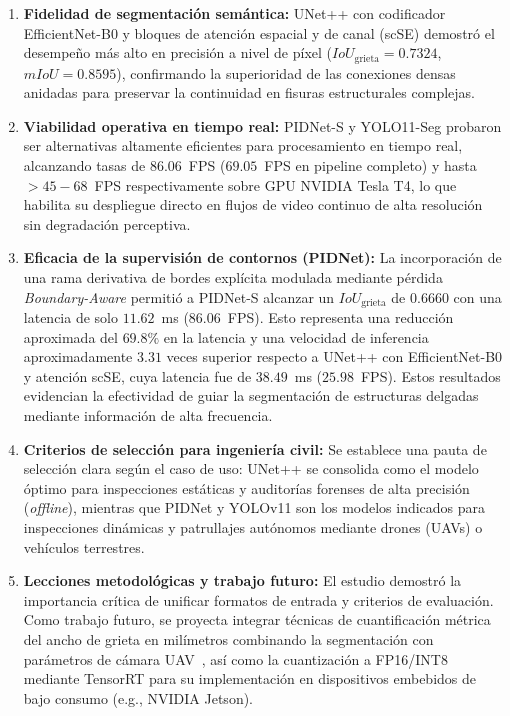 \documentclass[conference]{IEEEtran}
\begin{document}
\begin{enumerate}
    \item \textbf{Fidelidad de segmentación semántica:} UNet++ con codificador EfficientNet-B0 y bloques de atención espacial y de canal (scSE) demostró el desempeño más alto en precisión a nivel de píxel ($IoU_{\text{grieta}} = 0.7324$, $mIoU = 0.8595 $), confirmando la superioridad de las conexiones densas anidadas para preservar la continuidad en fisuras estructurales complejas.
    \item \textbf{Viabilidad operativa en tiempo real:} PIDNet-S y YOLO11-Seg probaron ser alternativas altamente eficientes para procesamiento en tiempo real, alcanzando tasas de $86.06$~FPS ($69.05$~FPS en pipeline completo) y hasta $>45-68$~FPS respectivamente sobre GPU NVIDIA Tesla T4, lo que habilita su despliegue directo en flujos de video continuo de alta resolución sin degradación perceptiva.
    \item \textbf{Eficacia de la supervisión de contornos (PIDNet):} La incorporación de una rama derivativa de bordes explícita modulada mediante pérdida \textit{Boundary-Aware} permitió a PIDNet-S alcanzar un $IoU_{\text{grieta}}$ de $0.6660$ con una latencia de solo $11.62$~ms ($86.06$~FPS). Esto representa una reducción aproximada del $69.8\%$ en la latencia y una velocidad de inferencia aproximadamente $3.31$ veces superior respecto a UNet++ con EfficientNet-B0 y atención scSE, cuya latencia fue de $38.49$~ms ($25.98$~FPS). Estos resultados evidencian la efectividad de guiar la segmentación de estructuras delgadas mediante información de alta frecuencia.
    \item \textbf{Criterios de selección para ingeniería civil:} Se establece una pauta de selección clara según el caso de uso: UNet++ se consolida como el modelo óptimo para inspecciones estáticas y auditorías forenses de alta precisión (\textit{offline}), mientras que PIDNet y YOLOv11 son los modelos indicados para inspecciones dinámicas y patrullajes autónomos mediante drones (UAVs) o vehículos terrestres.
    \item \textbf{Lecciones metodológicas y trabajo futuro:} El estudio demostró la importancia crítica de unificar formatos de entrada y criterios de evaluación. Como trabajo futuro, se proyecta integrar técnicas de cuantificación métrica del ancho de grieta en milímetros combinando la segmentación con parámetros de cámara UAV~\cite{liu2025crack}, así como la cuantización a FP16/INT8 mediante TensorRT para su implementación en dispositivos embebidos de bajo consumo (e.g., NVIDIA Jetson).
\end{enumerate}



\end{document}
